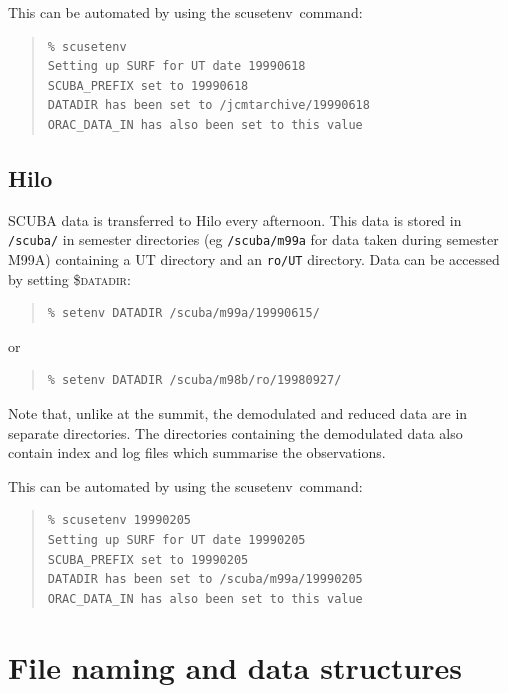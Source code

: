 \documentclass[twoside,11pt]{article}
\newcommand{\task}[1]{{\sf #1}}
\newcommand{\scusetenv}{\htmlref{\task{scusetenv}}{SCUSETENV}}
\newenvironment{myquote}{\begin{quote}\begin{small}}{\end{small}\end{quote}}
\newcommand{\htmlref}[2]{#1}
\newcommand{\xlabel}[1]{}
\renewcommand{\_}{\texttt{\symbol{95}}}
\begin{document}
This can be automated by using the \scusetenv\ command:

\begin{myquote}
\begin{verbatim}
% scusetenv
Setting up SURF for UT date 19990618
SCUBA_PREFIX set to 19990618
DATADIR has been set to /jcmtarchive/19990618
ORAC_DATA_IN has also been set to this value
\end{verbatim}
\end{myquote}

\subsection{Hilo}

SCUBA data is transferred to Hilo every afternoon. This data is stored in
\texttt{/scuba/} in semester directories (eg \texttt{/scuba/m99a} for data
taken during semester M99A) containing a UT directory and an \texttt{ro/UT}
directory. Data can be accessed by setting
\textsc{\$datadir}: %

\begin{myquote}
\begin{verbatim}
% setenv DATADIR /scuba/m99a/19990615/
\end{verbatim}
\end{myquote}
or
\begin{myquote}
\begin{verbatim}
% setenv DATADIR /scuba/m98b/ro/19980927/
\end{verbatim}
\end{myquote}

Note that, unlike at the summit, the demodulated and reduced data are in
separate directories. The directories containing the demodulated data also
contain index and log files which summarise the observations.

This can be automated by using the \scusetenv\ command:

\begin{myquote}
\begin{verbatim}
% scusetenv 19990205
Setting up SURF for UT date 19990205
SCUBA_PREFIX set to 19990205
DATADIR has been set to /scuba/m99a/19990205
ORAC_DATA_IN has also been set to this value
\end{verbatim}
\end{myquote}


\section{\xlabel{filenames}File naming and data structures\label{filenames}}
\end{document}
